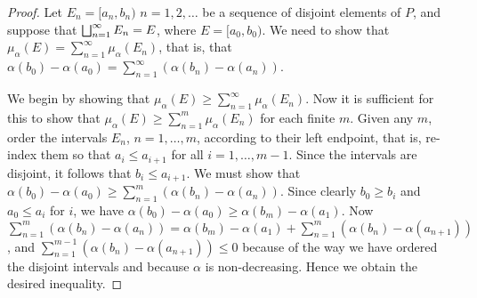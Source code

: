 \begin{proof}
Let $E_n=[a_n, b_n)$ $n=1, 2, \dots$ be a sequence of disjoint elements of $P$, and suppose that $\bigsqcup_{n=1}^\infty E_n=E$, where $E=[a_0, b_0)$. We need to show that $\mu_\alpha(E)=\sum_{n=1}^\infty\mu_\alpha(E_n)$, that is, that $\alpha(b_0)-\alpha(a_0)=\sum_{n=1}^\infty(\alpha(b_n)-\alpha(a_n))$.

We begin by showing that $\mu_\alpha(E)\geq\sum_{n=1}^\infty\mu_\alpha(E_n)$. Now it is sufficient for this to show that $\mu_\alpha(E)\geq\sum_{n=1}^m\mu_\alpha(E_n)$ for each finite $m$. Given any $m$, order the intervals $E_n$, $n=1,\dots,m$, according to their left endpoint, that is, re-index them so that $a_i\leq a_{i+1}$ for all $i=1, \dots, m-1$. Since the intervals are disjoint, it follows that $b_i \leq a_{i+1}$. We must show that $\alpha(b_0)-\alpha(a_0) \geq \sum_{n=1}^m(\alpha(b_n)-\alpha(a_n))$. Since clearly $b_0 \geq b_i$ and $a_0 \leq a_i$ for $i$, we have $\alpha(b_0)-\alpha(a_0)\geq\alpha(b_m)-\alpha(a_1)$. Now $\sum_{n=1}^m(\alpha(b_n)-\alpha(a_n))=\alpha(b_m)-\alpha(a_1)+\sum_{n=1}^m(\alpha(b_n)-\alpha(a_{n+1}))$, and $\sum_{n=1}^{m-1}(\alpha(b_n)-\alpha(a_{n+1})) \leq 0$ because of the way we have ordered the disjoint intervals and because $\alpha$ is non-decreasing. Hence we obtain the desired inequality.


\end{proof}
